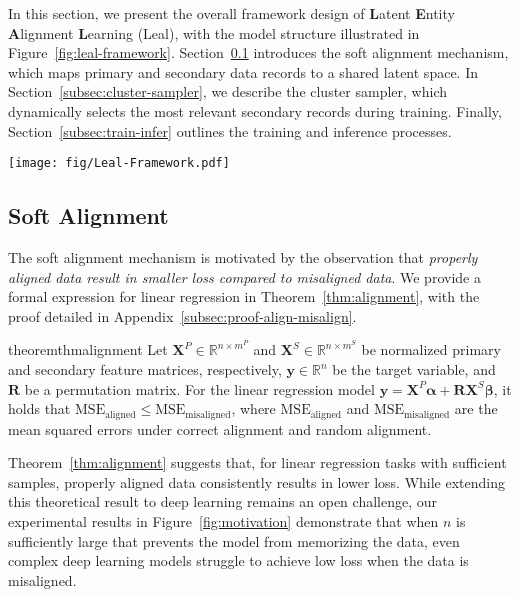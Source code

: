 In this section, we present the overall framework design of \textbf{L}atent \textbf{E}ntity \textbf{A}lignment \textbf{L}earning (Leal), with the model structure illustrated in Figure~\ref{fig:leal-framework}. Section~\ref{subsec:soft-alignment} introduces the soft alignment mechanism, which maps primary and secondary data records to a shared latent space. In Section~\ref{subsec:cluster-sampler}, we describe the cluster sampler, which dynamically selects the most relevant secondary records during training. Finally, Section~\ref{subsec:train-infer} outlines the training and inference processes.


\begin{figure*}[t!]
    \centering
    \texttt{[image: fig/Leal-Framework.pdf]}
    \caption{Overall model structure of Leal}
    \label{fig:leal-framework}
\end{figure*}


\subsection{Soft Alignment}\label{subsec:soft-alignment}

The soft alignment mechanism is motivated by the observation that \textit{properly aligned data result in smaller loss compared to misaligned data}. We provide a formal expression for linear regression in Theorem~\ref{thm:alignment}, with the proof detailed in Appendix~\ref{subsec:proof-align-misalign}.
\begin{restatable}{theorem}{thmalignment}\label{thm:alignment}
    Let $\mathbf{X}^P\in \mathbb{R}^{n \times m^P}$ and $\mathbf{X}^S\in \mathbb{R}^{n \times m^S}$ be normalized primary and secondary feature matrices, respectively, $\mathbf{y}\in \mathbb{R}^{n}$ be the target variable, and $\mathbf{R}$ be a permutation matrix. For the linear regression model $\mathbf{y} = \mathbf{X}^P \boldsymbol{\alpha} + \mathbf{R}\mathbf{X}^S \boldsymbol{\beta}$, it holds that $\mathrm{MSE}_{\mathrm{aligned}} \leq \mathrm{MSE}_{\mathrm{misaligned}}$, where $\mathrm{MSE}_{\mathrm{aligned}}$ and $\mathrm{MSE}_{\mathrm{misaligned}}$ are the mean squared errors under correct alignment and random alignment.
\end{restatable}

Theorem~\ref{thm:alignment} suggests that, for linear regression tasks with sufficient samples, properly aligned data consistently results in lower loss. While extending this theoretical result to deep learning remains an open challenge, our experimental results in Figure~\ref{fig:motivation} demonstrate that when \(n\) is sufficiently large that prevents the model from memorizing the data, even complex deep learning models struggle to achieve low loss when the data is misaligned.


